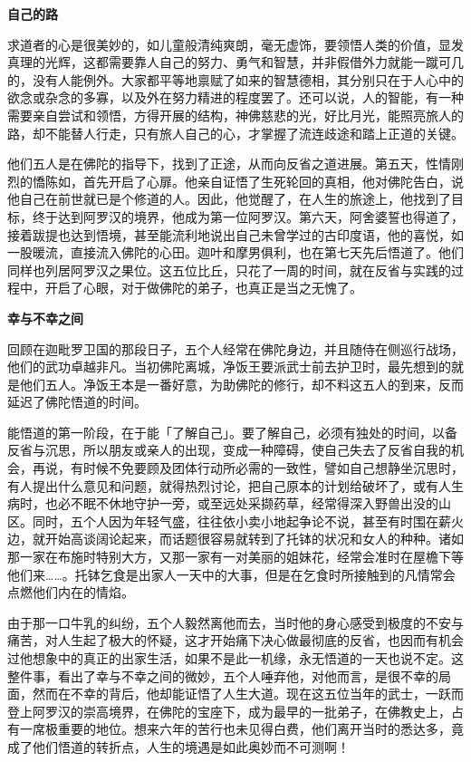 \documentclass[twoside,openany]{book}
\newcommand{\mt}[1]{\textbullet \textbf{#1}}
\begin{document}
\mt{自己的路}

求道者的心是很美妙的，如儿童般清纯爽朗，毫无虚饰，要领悟人类的价值，显发真理的光辉，这都需要靠人自己的努力、勇气和智慧，并非假借外力就能一蹴可几的，没有人能例外。大家都平等地禀赋了如来的智慧德相，其分别只在于人心中的欲念或杂念的多寡，以及外在努力精进的程度罢了。还可以说，人的智能，有一种需要亲自尝试和领悟，方得开展的结构，神佛慈悲的光，好比月光，能照亮旅人的路，却不能替人行走，只有旅人自己的心，才掌握了流连歧途和踏上正道的关键。

他们五人是在佛陀的指导下，找到了正途，从而向反省之道进展。第五天，性情刚烈的憍陈如，首先开启了心扉。他亲自证悟了生死轮回的真相，他对佛陀告白，说他自己在前世就已是个修道的人。因此，他觉醒了，在人生的旅途上，他找到了目标，终于达到阿罗汉的境界，他成为第一位阿罗汉。第六天，阿舍婆誓也得道了，接着跋提也达到悟境，甚至能流利地说出自己未曾学过的古印度语，他的喜悦，如一股暖流，直接流入佛陀的心田。迦叶和摩男俱利，也在第七天先后悟道了。他们同样也列居阿罗汉之果位。这五位比丘，只花了一周的时间，就在反省与实践的过程中，开启了心眼，对于做佛陀的弟子，也真正是当之无愧了。

\mt{幸与不幸之间}

回顾在迦毗罗卫国的那段日子，五个人经常在佛陀身边，并且随侍在侧巡行战场，他们的武功卓越非凡。当初佛陀离城，净饭王要派武士前去护卫时，最先想到的就是他们五人。净饭王本是一番好意，为助佛陀的修行，却不料这五人的到来，反而延迟了佛陀悟道的时间。

能悟道的第一阶段，在于能「了解自己」。要了解自己，必须有独处的时间，以备反省与沉思，所以朋友或亲人的出现，变成一种障碍，使自己失去了反省自我的机会，再说，有时候不免要顾及团体行动所必需的一致性，譬如自己想静坐沉思时，有人提出什么意见和问题，就得热烈讨论，把自己原本的计划给破坏了，或有人生病时，也必不眠不休地守护一旁，或至远处采撷药草，经常得深入野兽出没的山区。同时，五个人因为年轻气盛，往往依小卖小地起争论不说，甚至有时围在薪火边，就开始高谈阔论起来，而话题很容易就转到了托钵的状况和女人的种种。诸如那一家在布施时特别大方，又那一家有一对美丽的姐妹花，经常会准时在屋檐下等他们来……。托钵乞食是出家人一天中的大事，但是在乞食时所接触到的凡情常会点燃他们内在的情焰。

由于那一口牛乳的纠纷，五个人毅然离他而去，当时他的身心感受到极度的不安与痛苦，对人生起了极大的怀疑，这才开始痛下决心做最彻底的反省，也因而有机会过他想象中的真正的出家生活，如果不是此一机缘，永无悟道的一天也说不定。这整件事，看出了幸与不幸之间的微妙，五个人唾弃他，对他而言，是很不幸的局面，然而在不幸的背后，他却能证悟了人生大道。现在这五位当年的武士，一跃而登上阿罗汉的崇高境界，在佛陀的宝座下，成为最早的一批弟子，在佛教史上，占有一席极重要的地位。想来六年的苦行也未见得白费，他们离开当时的悉达多，竟成了他们悟道的转折点，人生的境遇是如此奥妙而不可测啊！
\end{document}
